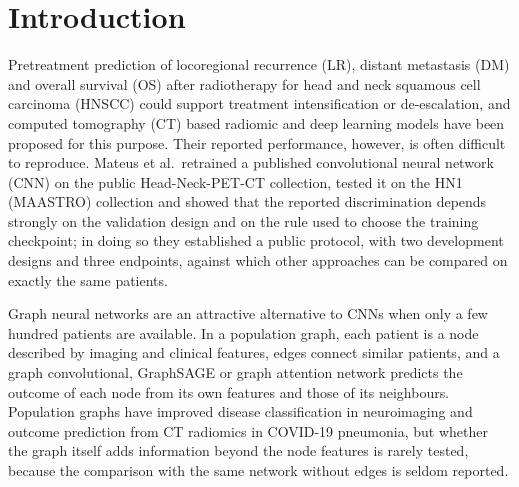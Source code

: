 \documentclass[11pt,a4paper]{article}
\begin{document}
\begin{abstract}
\noindent \textbf{Conclusion:} Under the CNN benchmark protocol, radiomic models of the whole tumour matched or exceeded the published CNN for LR and OS and approached it for DM, but the improvement came from including the nodal tumour in the radiomic region, which also harmonises inconsistent primary delineations across cohorts, and not from the patient graph, which added nothing over the same network without edges. For LR, clinical variables including HPV status remained stronger than any imaging model. Population graph studies should report the no-edge control, and radiomic comparisons with image-based deep learning should use the same tumour region.

\noindent\textbf{Keywords:} Head and neck cancer, Radiomics, Graph neural network, Population graph, Nodal tumour volume, External validation, Reproducibility, Radiotherapy outcome
\end{abstract}

\section{Introduction}\label{sec:intro}

Pretreatment prediction of locoregional recurrence (LR), distant metastasis (DM) and overall survival (OS) after radiotherapy for head and neck squamous cell carcinoma (HNSCC) could support treatment intensification or de-escalation, and computed tomography (CT) based radiomic and deep learning models have been proposed for this purpose\cite{aerts2014,vallieres2017,diamant2019,kazmierski2023}. Their reported performance, however, is often difficult to reproduce. Mateus et al.\ retrained a published convolutional neural network (CNN) on the public Head-Neck-PET-CT collection, tested it on the HN1 (MAASTRO) collection and showed that the reported discrimination depends strongly on the validation design and on the rule used to choose the training checkpoint; in doing so they established a public protocol, with two development designs and three endpoints, against which other approaches can be compared on exactly the same patients\cite{mateus2023}.

Graph neural networks are an attractive alternative to CNNs when only a few hundred patients are available. In a population graph, each patient is a node described by imaging and clinical features, edges connect similar patients, and a graph convolutional, GraphSAGE or graph attention network predicts the outcome of each node from its own features and those of its neighbours\cite{parisot2018population,kipf2017gcn,hamilton2017graphsage,velickovic2018gat}. Population graphs have improved disease classification in neuroimaging\cite{parisot2018population} and outcome prediction from CT radiomics in COVID-19 pneumonia\cite{keicher2023covid}, but whether the graph itself adds information beyond the node features is rarely tested, because the comparison with the same network without edges is seldom reported.
\end{document}
